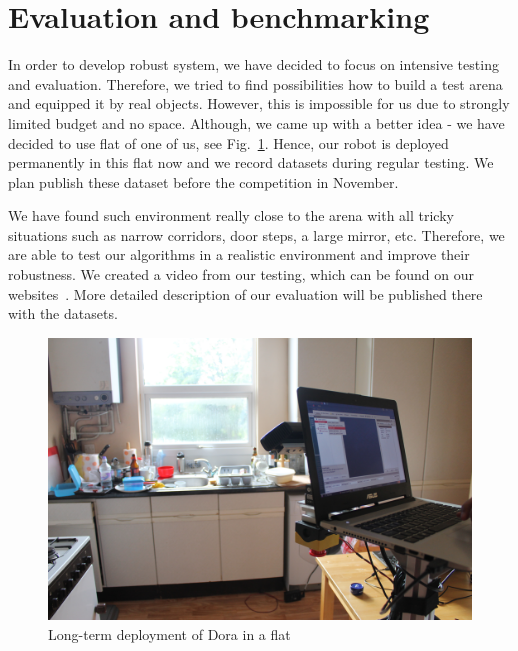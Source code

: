 \section{Evaluation and benchmarking}

In order to develop robust system, we have decided to focus on intensive testing and evaluation. 
Therefore, we tried to find possibilities how to build a test arena and equipped it by real objects.
However, this is impossible for us due to strongly limited budget and no space. 
Although, we came up with a better idea - we have decided to use flat of one of us, see Fig.~\ref{fig:kitchen}.
Hence, our robot is deployed permanently in this flat now and we record datasets during regular testing. We plan publish these dataset before the competition in November.  

We have found such environment really close to the arena with all tricky situations such as narrow corridors, door steps, a large mirror, etc. 
Therefore, we are able to test our algorithms in a realistic environment and improve their robustness.
We created a video from our testing, which can be found on our websites~\cite{barc_web}. More detailed description of our evaluation will be published there with the datasets.

\begin{figure}[!htb]
\centering
\includegraphics[width=3.in]{kitchen.JPG}
\caption{Long-term deployment of Dora in a flat}
\label{fig:kitchen}
\end{figure}  